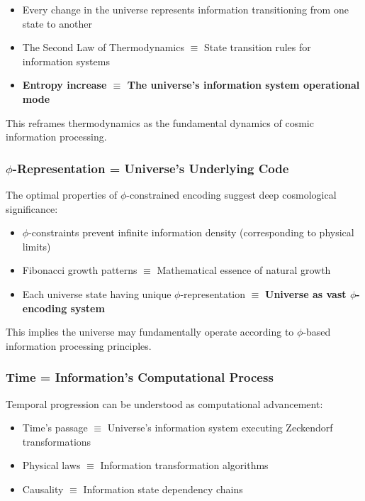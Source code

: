 \documentclass[12pt,letterpaper]{article}
\begin{document}
\begin{itemize}
\item Every change in the universe represents information transitioning from one state to another
\item The Second Law of Thermodynamics $\equiv$ State transition rules for information systems
\item \textbf{Entropy increase $\equiv$ The universe's information system operational mode}
\end{itemize}

This reframes thermodynamics as the fundamental dynamics of cosmic information processing.

\subsubsection{$\phi$-Representation = Universe's Underlying Code}

The optimal properties of $\phi$-constrained encoding suggest deep cosmological significance:

\begin{itemize}
\item $\phi$-constraints prevent infinite information density (corresponding to physical limits)
\item Fibonacci growth patterns $\equiv$ Mathematical essence of natural growth
\item Each universe state having unique $\phi$-representation $\equiv$ \textbf{Universe as vast $\phi$-encoding system}
\end{itemize}

This implies the universe may fundamentally operate according to $\phi$-based information processing principles.

\subsubsection{Time = Information's Computational Process}

Temporal progression can be understood as computational advancement:

\begin{itemize}
\item Time's passage $\equiv$ Universe's information system executing Zeckendorf transformations
\item Physical laws $\equiv$ Information transformation algorithms
\item Causality $\equiv$ Information state dependency chains
\end{itemize}
\end{document}
